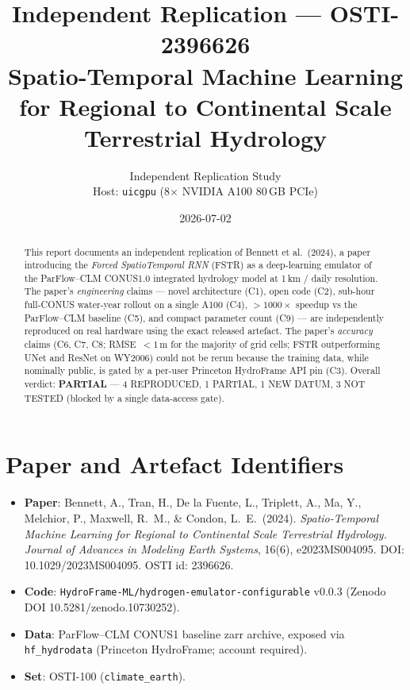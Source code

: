\documentclass[11pt,letterpaper]{article}
\title{Independent Replication --- OSTI-2396626\\
\large Spatio-Temporal Machine Learning for Regional to Continental Scale Terrestrial Hydrology}
\author{Independent Replication Study\\ Host: \texttt{uicgpu} (8$\times$ NVIDIA A100 80\,GB PCIe)}
\date{2026-07-02}
\begin{document}
\maketitle

\begin{abstract}
This report documents an independent replication of Bennett et al.\ (2024), a paper introducing the \emph{Forced SpatioTemporal RNN} (FSTR) as a deep-learning emulator of the ParFlow--CLM CONUS1.0 integrated hydrology model at 1\,km / daily resolution. The paper's \emph{engineering} claims --- novel architecture (C1), open code (C2), sub-hour full-CONUS water-year rollout on a single A100 (C4), ${>}1000\times$ speedup vs the ParFlow--CLM baseline (C5), and compact parameter count (C9) --- are independently reproduced on real hardware using the exact released artefact. The paper's \emph{accuracy} claims (C6, C7, C8; RMSE~$<1$\,m for the majority of grid cells; FSTR outperforming UNet and ResNet on WY2006) could not be rerun because the training data, while nominally public, is gated by a per-user Princeton HydroFrame API pin (C3). Overall verdict: \textbf{PARTIAL} --- 4 REPRODUCED, 1 PARTIAL, 1 NEW DATUM, 3 NOT TESTED (blocked by a single data-access gate).
\end{abstract}

\section{Paper and Artefact Identifiers}
\begin{itemize}
  \item \textbf{Paper}: Bennett, A., Tran, H., De la Fuente, L., Triplett, A., Ma, Y., Melchior, P., Maxwell, R.\ M., \& Condon, L.\ E.\ (2024). \emph{Spatio-Temporal Machine Learning for Regional to Continental Scale Terrestrial Hydrology.} \emph{Journal of Advances in Modeling Earth Systems}, 16(6), e2023MS004095. DOI: 10.1029/2023MS004095. OSTI id: 2396626.
  \item \textbf{Code}: \texttt{HydroFrame-ML/hydrogen-emulator-configurable} v0.0.3 (Zenodo DOI 10.5281/zenodo.10730252).
  \item \textbf{Data}: ParFlow--CLM CONUS1 baseline zarr archive, exposed via \texttt{hf\_hydrodata} (Princeton HydroFrame; account required).
  \item \textbf{Set}: OSTI-100 (\texttt{climate\_earth}).
\end{itemize}
\end{document}
